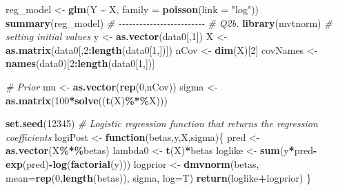 \documentclass[]{article}
\newenvironment{Shaded}{\begin{snugshade}}{\end{snugshade}}
\newcommand{\CommentTok}[1]{\textcolor[rgb]{0.56,0.35,0.01}{\textit{#1}}}
\newcommand{\ControlFlowTok}[1]{\textcolor[rgb]{0.13,0.29,0.53}{\textbf{#1}}}
\newcommand{\DataTypeTok}[1]{\textcolor[rgb]{0.13,0.29,0.53}{#1}}
\newcommand{\DecValTok}[1]{\textcolor[rgb]{0.00,0.00,0.81}{#1}}
\newcommand{\KeywordTok}[1]{\textcolor[rgb]{0.13,0.29,0.53}{\textbf{#1}}}
\newcommand{\NormalTok}[1]{#1}
\newcommand{\OperatorTok}[1]{\textcolor[rgb]{0.81,0.36,0.00}{\textbf{#1}}}
\newcommand{\StringTok}[1]{\textcolor[rgb]{0.31,0.60,0.02}{#1}}
\begin{document}
\begin{Shaded}
\begin{Highlighting}[]
\NormalTok{reg\_model \textless{}{-}}\StringTok{ }\KeywordTok{glm}\NormalTok{(Y }\OperatorTok{\textasciitilde{}}\StringTok{ }\NormalTok{X, }\DataTypeTok{family =} \KeywordTok{poisson}\NormalTok{(}\DataTypeTok{link =} \StringTok{"log"}\NormalTok{))}
\KeywordTok{summary}\NormalTok{(reg\_model)}
\CommentTok{\# {-}{-}{-}{-}{-}{-}{-}{-}{-}{-}{-}{-}{-}{-}{-}{-}{-}{-}{-}{-}{-}{-}{-}{-}{-}}
\CommentTok{\# Q2b.}
\KeywordTok{library}\NormalTok{(mvtnorm)}
\CommentTok{\# setting initial values}
\NormalTok{y \textless{}{-}}\StringTok{ }\KeywordTok{as.vector}\NormalTok{(data0[,}\DecValTok{1}\NormalTok{])}
\NormalTok{X \textless{}{-}}\StringTok{ }\KeywordTok{as.matrix}\NormalTok{(data0[,}\DecValTok{2}\OperatorTok{:}\KeywordTok{length}\NormalTok{(data0[}\DecValTok{1}\NormalTok{,])])}
\NormalTok{nCov \textless{}{-}}\StringTok{ }\KeywordTok{dim}\NormalTok{(X)[}\DecValTok{2}\NormalTok{]}
\NormalTok{covNames \textless{}{-}}\StringTok{ }\KeywordTok{names}\NormalTok{(data0)[}\DecValTok{2}\OperatorTok{:}\KeywordTok{length}\NormalTok{(data0[}\DecValTok{1}\NormalTok{,])]}

\CommentTok{\# Prior}
\NormalTok{mu \textless{}{-}}\StringTok{ }\KeywordTok{as.vector}\NormalTok{(}\KeywordTok{rep}\NormalTok{(}\DecValTok{0}\NormalTok{,nCov))}
\NormalTok{sigma \textless{}{-}}\StringTok{ }\KeywordTok{as.matrix}\NormalTok{(}\DecValTok{100}\OperatorTok{*}\KeywordTok{solve}\NormalTok{((}\KeywordTok{t}\NormalTok{(X)}\OperatorTok{\%*\%}\NormalTok{X)))}

\KeywordTok{set.seed}\NormalTok{(}\DecValTok{12345}\NormalTok{)}
\CommentTok{\# Logistic regression function that returns the regression coefficients}
\NormalTok{logiPost \textless{}{-}}\StringTok{ }\ControlFlowTok{function}\NormalTok{(betas,y,X,sigma)\{}
\NormalTok{  pred \textless{}{-}}\StringTok{ }\KeywordTok{as.vector}\NormalTok{(X}\OperatorTok{\%*\%}\NormalTok{betas)}
\NormalTok{  lambda0 \textless{}{-}}\StringTok{ }\KeywordTok{t}\NormalTok{(X)}\OperatorTok{*}\NormalTok{betas}
\NormalTok{  loglike \textless{}{-}}\StringTok{ }\KeywordTok{sum}\NormalTok{(y}\OperatorTok{*}\NormalTok{pred}\OperatorTok{{-}}\KeywordTok{exp}\NormalTok{(pred)}\OperatorTok{{-}}\KeywordTok{log}\NormalTok{(}\KeywordTok{factorial}\NormalTok{(y)))}
\NormalTok{  logprior \textless{}{-}}\StringTok{ }\KeywordTok{dmvnorm}\NormalTok{(betas, }\DataTypeTok{mean=}\KeywordTok{rep}\NormalTok{(}\DecValTok{0}\NormalTok{,}\KeywordTok{length}\NormalTok{(betas)), sigma, }\DataTypeTok{log=}\NormalTok{T)}
  \KeywordTok{return}\NormalTok{(loglike}\OperatorTok{+}\NormalTok{logprior)}
\NormalTok{\}}


\end{Highlighting}
\end{Shaded}
\end{document}
